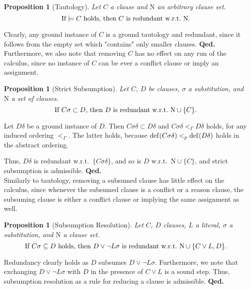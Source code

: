 \documentclass[a4paper]{article}
\newcommand{\startproof}{{\bf Proof:~}}
\newcommand{\finishproof}{{\bf Qed.}}
\newcommand{\leaveabit}{\\[6 pt]}
\newtheorem{prop}[defi]{Proposition}
\begin{document}
\begin{prop}[Tautology] Let $C$ a clause and $\text{N}$ an arbitrary clause set.
\[\text{If $\models C$ holds, then $C$ is redundant w.r.t.\
$\text{N}$.}\]
\end{prop}
\noindent\startproof
Clearly, any ground instance of $C$ is a ground tautology and redundant, since it follows from the empty set which "contains" only smaller clauses.
\finishproof\leaveabit
\indent
Furthermore,  we also note that removing $C$ has no effect on any run of the calculus, 
since no instance of $C$ can be ever a conflict clause or imply an assignment.

\begin{prop}[Strict Subsumption]\label{propSubs}
Let $C$, $D$ be clauses, $\sigma$ a substitution, and $\text{N}$ a set of clauses. 
\[\text{If $C\sigma \subset D$, then $D$ is redundant w.r.t.\
$\text{N} \cup \{C\}$.}\]
\end{prop}
\noindent\startproof
Let $D\delta$ be a ground instance of $D$. Then $C\sigma\delta \subset D\delta$ and $C\sigma\delta <_{\Gamma} D\delta$ holds, for any induced ordering $<_{\Gamma}$. 
The latter holds, because $\operatorname{def}(C\sigma\delta) <_p \operatorname{def}(D\delta)$ holds in the abstract ordering.

Thus, $D\delta$ is redundant w.r.t.\
$\{C\sigma\delta\}$, and so is $D$ w.r.t.\
$\text{N} \cup \{C\}$, and strict subsumption is admissible.
\finishproof\leaveabit
\indent
Similarly to tautology, removing a subsumed clause has little effect on the calculus, since whenever the subsumed clause is  a conflict or a reason clause, the subsuming clause is either a
conflict clause or implying the same assignment as well.

\begin{prop}[Subsumption Resolution] 
Let $C$, $D$ clauses, $L$ a literal, $\sigma$ a substitution, and $\text{N}$ a clause set.
\[\text{If $C\sigma \subseteq D$ holds, then $D \lor \neg L\sigma$ is redundant w.r.t.\
$\text{N} \cup \{C \lor L, D\}$.}\]
\end{prop}
\noindent\startproof
Redundancy clearly holds as $D$ subsumes $D \lor \neg L\sigma$. 
Furthermore, we note that exchanging $D \lor \neg L\sigma$ with $D$ in the presence of $C \lor L$ is a sound step.
Thus, subsumption resolution as a rule for reducing a clause is admissible.
\finishproof
\end{document}
